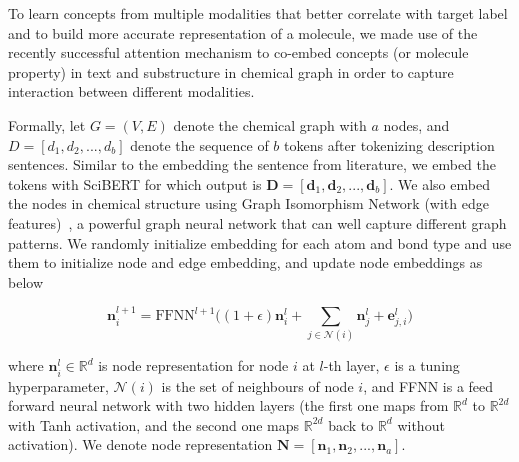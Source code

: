To learn concepts from multiple modalities that better correlate with target label and to build more accurate representation of a molecule, we made use of the recently successful attention mechanism to co-embed concepts (or molecule property) in text and substructure in chemical graph in order to capture interaction between different modalities. 

Formally, let $G=(V,E)$ denote the chemical graph with $a$ nodes, and $D=[ d_1,d_2,...,d_b]$ denote the sequence of $b$ tokens after tokenizing description sentences. Similar to the embedding the sentence from literature, we embed the tokens with SciBERT  for which output is $\mathbf{D}=[\mathbf{d}_1,\mathbf{d}_2,...,\mathbf{d}_b]$. We also embed the nodes in chemical structure using Graph Isomorphism Network (with edge features)~\cite{gin}, a powerful graph neural network that can well capture different graph patterns. We randomly initialize embedding for each atom and bond type and use them to initialize node and edge embedding, and update node embeddings as below

\begin{equation}
\mathbf{n}_i^{l+1}=\text{FFNN}^{l+1}\bigg((1+\epsilon)\mathbf{n}_i^{l}+\sum_{j\in\mathcal{N}(i)}\mathbf{n}_j^{l}+\mathbf{e}^{l}_{j,i}\bigg)
\end{equation}


\noindent where $\mathbf{n}_i^{l}\in \mathbb{R}^d$ is node representation for node $i$ at $l$-th layer, $\epsilon$ is a tuning hyperparameter, $\mathcal{N}(i)$ is the set of neighbours of node $i$, and FFNN is a feed forward neural network with two hidden layers (the first one maps from $\mathbb{R}^d$ to $\mathbb{R}^{2d}$ with Tanh activation, and the second one maps $\mathbb{R}^{2d}$ back to $\mathbb{R}^{d}$ without activation). We denote node representation $\mathbf{N}=[\mathbf{n}_1,\mathbf{n}_2,...,\mathbf{n}_a]$.


